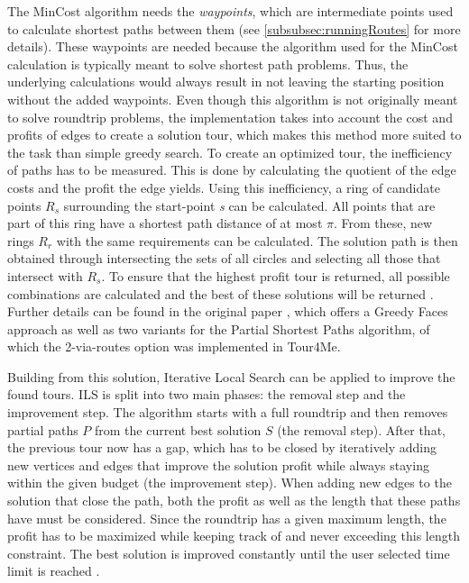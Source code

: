 The MinCost algorithm \cite{buchin_tour4me_2022, gemsa_efficient_2013} needs the \textit{waypoints}, which are intermediate points used to calculate shortest paths between them (see \ref{subsubsec:runningRoutes} for more details).
These waypoints are needed because the algorithm used for the MinCost calculation is typically meant to solve shortest path problems. 
Thus, the underlying calculations would always result in not leaving the starting position without the added waypoints. 
Even though this algorithm is not originally meant to solve roundtrip problems, the implementation takes into account the cost and profits of edges to create a solution tour, which makes this method more suited to the task than simple greedy search.
To create an optimized tour, the inefficiency of paths has to be measured. 
This is done by calculating the quotient of the edge costs and the profit the edge yields. 
Using this inefficiency, a ring of candidate points $R_s$ surrounding the start-point \textit{s} can be calculated.
All points that are part of this ring have a shortest path distance of at most $\pi$.
From these, new rings $R_r$ with the same requirements can be calculated. 
The solution path is then obtained through intersecting the sets of all circles and selecting all those that intersect with $R_s$.
To ensure that the highest profit tour is returned, all possible combinations are calculated and the best of these solutions will be returned \cite{buchin_tour4me_2022}. 
Further details can be found in the original paper \cite{gemsa_efficient_2013}, which offers a Greedy Faces approach as well as two variants for the Partial Shortest Paths algorithm, of which the 2-via-routes option was implemented in Tour4Me.

Building from this solution, Iterative Local Search \cite{buchin_tour4me_2022, lu_arc_2015, verbeeck_extension_2014} can be applied to improve the found tours.
ILS is split into two main phases: the removal step and the improvement step.
The algorithm starts with a full roundtrip and then removes partial paths $P$ from the current best solution $S$ (the removal step).
After that, the previous tour now has a gap, which has to be closed by iteratively adding new vertices and edges that improve the solution profit while always staying within the given budget (the improvement step).
When adding new edges to the solution that close the path, both the profit as well as the length that these paths have must be considered. 
Since the roundtrip has a given maximum length, the profit has to be maximized while keeping track of and never exceeding this length constraint.
The best solution is improved constantly until the user selected time limit is reached \cite{buchin_tour4me_2022}.

